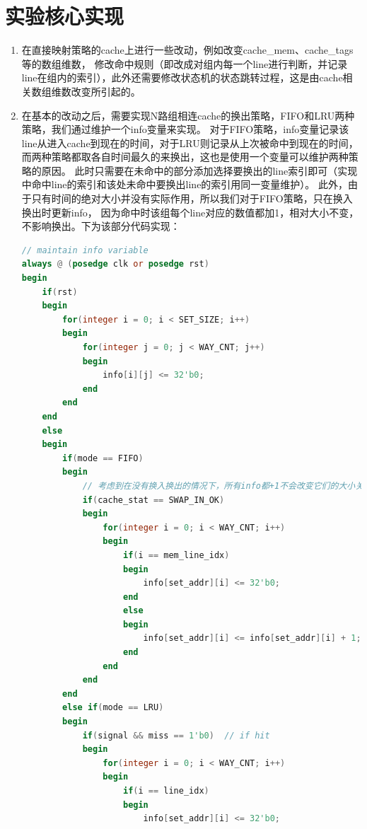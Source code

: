 \documentclass[UTF8]{article}
\begin{document}
    \section{实验核心实现}
    \begin{enumerate}
        \item 在直接映射策略的cache上进行一些改动，例如改变{\jetbrains cache\_mem}、{\jetbrains cache\_tags}等的数组维数，
        修改命中规则（即改成对组内每一个line进行判断，并记录line在组内的索引），此外还需要修改状态机的状态跳转过程，这是由cache相关数组维数改变所引起的。
        \item 在基本的改动之后，需要实现N路组相连cache的换出策略，FIFO和LRU两种策略，我们通过维护一个{\jetbrains info}变量来实现。
        对于FIFO策略，{\jetbrains info}变量记录该line从进入cache到现在的时间，对于LRU则记录从上次被命中到现在的时间，
        而两种策略都取各自时间最久的来换出，这也是使用一个变量可以维护两种策略的原因。
        此时只需要在未命中的部分添加选择要换出的line索引即可（实现中命中line的索引和该处未命中要换出line的索引用同一变量维护）。
        此外，由于只有时间的绝对大小并没有实际作用，所以我们对于FIFO策略，只在换入换出时更新{\jetbrains info}，
        因为命中时该组每个line对应的数值都加1，相对大小不变，不影响换出。下为该部分代码实现：\\
        \begin{lstlisting}[language=verilog]
// maintain info variable
always @ (posedge clk or posedge rst)
begin
    if(rst)
    begin
        for(integer i = 0; i < SET_SIZE; i++)
        begin
            for(integer j = 0; j < WAY_CNT; j++)
            begin
                info[i][j] <= 32'b0;
            end
        end
    end
    else
    begin
        if(mode == FIFO)
        begin
            // 考虑到在没有换入换出的情况下，所有info都+1不会改变它们的大小关系，故只在有换入换出时维护info
            if(cache_stat == SWAP_IN_OK)
            begin
                for(integer i = 0; i < WAY_CNT; i++)
                begin
                    if(i == mem_line_idx)
                    begin
                        info[set_addr][i] <= 32'b0;
                    end
                    else
                    begin
                        info[set_addr][i] <= info[set_addr][i] + 1;
                    end
                end
            end
        end
        else if(mode == LRU)
        begin
            if(signal && miss == 1'b0)  // if hit
            begin
                for(integer i = 0; i < WAY_CNT; i++)
                begin
                    if(i == line_idx)
                    begin
                        info[set_addr][i] <= 32'b0;

\end{lstlisting}
\end{enumerate}
\end{document}
